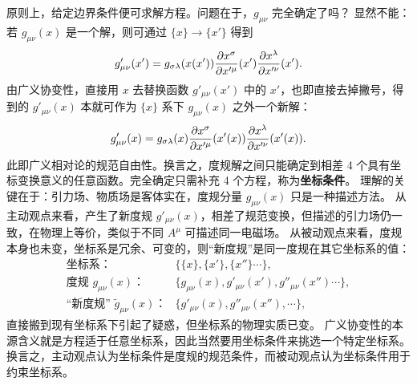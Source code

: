 原则上，给定边界条件便可求解方程。问题在于，$g_{\mu\nu}$ 完全确定了吗？
显然不能：若 $g_{\mu\nu}(x)$ 是一个解，则可通过 $\{x\}\to \{x'\}$ 得到
\[g'_{\mu\nu}(x')=g_{\sigma\lambda}(x(x')){\pdv{x^\sigma}{x'^\mu}}(x'){\pdv{x^\lambda}{x'^\nu}}(x').\]
由广义协变性，直接用 $x$ 去替换函数 $g'_{\mu\nu}(x')$ 中的 $x'$，也即直接去掉撇号，得到的 $g'_{\mu\nu}(x)$ 本就可作为 $\{x\}$ 系下 $g_{\mu\nu}(x)$ 之外一个新解：
\[g'_{\mu\nu}(x)=g_{\sigma\lambda}(x){\pdv{x^\sigma}{x'^\mu}}(x'(x)){\pdv{x^\lambda}{x'^\nu}}(x'(x)).\]
此即广义相对论的规范自由性。换言之，度规解之间只能确定到相差 4 个具有坐标变换意义的任意函数。完全确定只需补充 4 个方程，称为\textbf{坐标条件}。
理解的关键在于：引力场、物质场是客体实在，度规分量 $g_{\mu\nu}(x)$ 只是一种描述方法。
从主动观点来看，产生了新度规 $g'_{\mu\nu}(x)$，相差了规范变换，但描述的引力场仍一致，在物理上等价，类似于不同 $A^\mu$ 可描述同一电磁场。
从被动观点来看，度规本身也未变，坐标系是冗余、可变的，则“新度规”是同一度规在其它坐标系的值：
\begin{align*}
    \text{坐标系：}&\{\{x\},\{x'\},\{x''\}\cdots\},\\
    \text{度规 $g_{\mu\nu}(x)$：}&\{g_{\mu\nu}(x),g'_{\mu\nu}(x'),g''_{\mu\nu}(x'')\cdots\},\\
    \text{“新度规” $\tilde g_{\mu\nu}(x)$：}&\{g'_{\mu\nu}(x),g''_{\mu\nu}(x''),\cdots\},
\end{align*}
直接搬到现有坐标系下引起了疑惑，但坐标系的物理实质已变。
广义协变性的本源含义就是方程适于任意坐标系，因此当然要用坐标条件来挑选一个特定坐标系。
换言之，主动观点认为坐标条件是度规的规范条件，而被动观点认为坐标条件用于约束坐标系。

